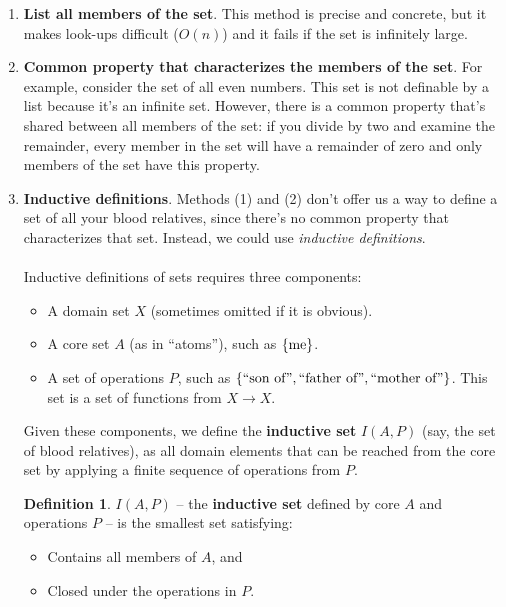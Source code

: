 \documentclass[]{article}
\DeclarePairedDelimiter{\set}{\lbrace}{\rbrace}
\theoremstyle{definition}
\newtheorem*{defn}{Definition}
\begin{document}
        \begin{enumerate}
          \item \textbf{List all members of the set}. This method is precise and concrete, but it makes look-ups difficult ($O(n)$) and it fails if the set is infinitely large.
          \item \textbf{Common property that characterizes the members of the set}. For example, consider the set of all even numbers. This set is not definable by a list because it's an infinite set. However, there is a common property that's shared between all members of the set: if you divide by two and examine the remainder, every member in the set will have a remainder of zero and only members of the set have this property.
          \item \textbf{Inductive definitions}. Methods (1) and (2) don't offer us a way to define a set of all your blood relatives, since there's no common property that characterizes that set. Instead, we could use \emph{inductive definitions}.
          \\ \\
          Inductive definitions of sets requires three components:
          \begin{itemize}
            \item A domain set $X$ (sometimes omitted if it is obvious).
            \item A core set $A$ (as in ``atoms''), such as $\set{ \text{me} }$.
            \item A set of operations $P$, such as $\set{ \text{``son of''}, \text{``father of''}, \text{``mother of''}}$. This set is a set of functions from $X \to X$.
          \end{itemize}

          Given these components, we define the \textbf{inductive set} $I(A, P)$ (say, the set of blood relatives), as all domain elements that can be reached from the core set by applying a finite sequence of operations from $P$.

          \begin{defn}
            $I(A, P)$ -- the \textbf{inductive set} defined by core $A$ and operations $P$ -- is the smallest set satisfying:
            \begin{itemize}
              \item Contains all members of $A$, and
              \item Closed under the operations in $P$.
            \end{itemize}
          \end{defn}


\end{enumerate}
\end{document}
